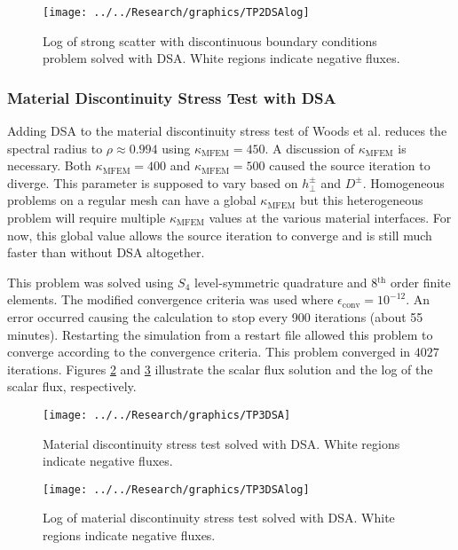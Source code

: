\documentclass{article}
\begin{document}
\begin{figure}[!h]
\centering
\texttt{[image: ../../Research/graphics/TP2DSAlog]}
\caption{Log of strong scatter with discontinuous boundary conditions problem solved with DSA. White regions indicate negative fluxes.}
\label{fig:TP2DSAlog}
\end{figure}

\FloatBarrier

\subsubsection{Material Discontinuity Stress Test with DSA}

Adding DSA to the material discontinuity stress test of Woods et al. \cite{WoodsHoDgfemXyCurved} reduces the spectral radius to $\rho \approx 0.994$ using $\kappa_\text{MFEM} = 450$. A discussion of $\kappa_\text{MFEM}$ is necessary. Both $\kappa_\text{MFEM} = 400$ and $\kappa_\text{MFEM} = 500$ caused the source iteration to diverge. This parameter is supposed to vary based on $h_\perp^\pm$ and $D^\pm$. Homogeneous problems on a regular mesh can have a global $\kappa_\text{MFEM}$ but this heterogeneous problem will require multiple $\kappa_\text{MFEM}$ values at the various material interfaces. For now, this global value allows the source iteration to converge and is still much faster than without DSA altogether.

This problem was solved using $S_4$ level-symmetric quadrature and 8$^\text{th}$ order finite elements. The modified convergence criteria was used where $\epsilon_\text{conv} = 10^{-12}$. An error occurred causing the calculation to stop every 900 iterations (about 55 minutes). Restarting the simulation from a restart file allowed this problem to converge according to the convergence criteria. This problem converged in $4027$ iterations. Figures \ref{fig:TP3DSA} and \ref{fig:TP3DSAlog} illustrate the scalar flux solution and the log of the scalar flux, respectively.

\begin{figure}[!h]
\centering
\texttt{[image: ../../Research/graphics/TP3DSA]}
\caption{Material discontinuity stress test solved with DSA. White regions indicate negative fluxes.}
\label{fig:TP3DSA}
\end{figure}

\begin{figure}[!h]
\centering
\texttt{[image: ../../Research/graphics/TP3DSAlog]}
\caption{Log of material discontinuity stress test solved with DSA. White regions indicate negative fluxes.}
\label{fig:TP3DSAlog}
\end{figure}
\end{document}
